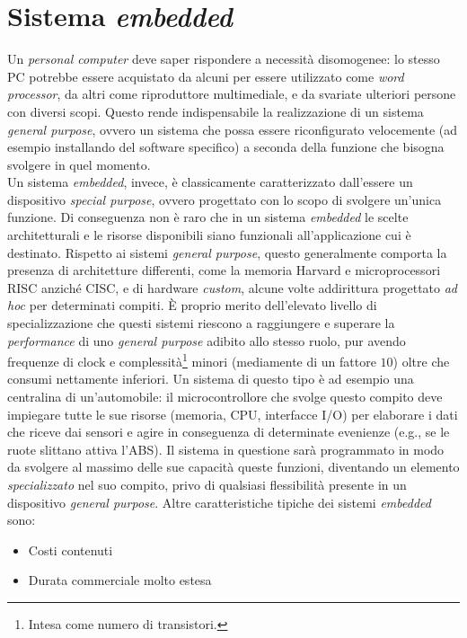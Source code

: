 \section{Sistema \emph{embedded}}
Un \emph{personal computer} deve saper rispondere a necessità disomogenee:
lo stesso PC potrebbe essere acquistato da alcuni per essere utilizzato come 
\emph{word processor}, da altri come riproduttore multimediale, e da svariate 
ulteriori persone con diversi scopi. Questo rende indispensabile la 
realizzazione di un sistema \emph{general purpose}, ovvero un sistema che possa 
essere riconfigurato velocemente (ad esempio installando del software 
specifico) a seconda della funzione che bisogna svolgere in quel momento.\\
Un sistema \emph{embedded}, invece, è classicamente caratterizzato dall'essere 
un dispositivo 
\emph{special purpose}, ovvero progettato con lo scopo di svolgere un'unica 
funzione. Di conseguenza non è raro che in un sistema \emph{embedded} 
le scelte architetturali e le risorse disponibili siano funzionali
all'applicazione cui è destinato. Rispetto ai sistemi \emph{general purpose}, 
questo generalmente comporta la presenza di architetture differenti, come la 
memoria Harvard e microprocessori RISC anziché CISC, e di hardware 
\emph{custom}, 
alcune volte addirittura progettato \emph{ad hoc} per determinati compiti.
\`E proprio 
merito dell'elevato livello di 
specializzazione che questi sistemi riescono a raggiungere e superare la 
\emph{performance} di uno \emph{general purpose} adibito allo stesso ruolo, pur 
avendo frequenze di clock e complessità\footnote{Intesa come numero di 
transistori.} minori (mediamente di un fattore $10$) oltre che consumi 
nettamente 
inferiori.
Un sistema di questo tipo è ad esempio una centralina di un'automobile: il 
microcontrollore che svolge questo compito deve impiegare tutte le sue risorse 
(memoria, CPU, interfacce I/O) per elaborare i dati che riceve dai sensori e 
agire in conseguenza di determinate evenienze (e.g., se le ruote slittano 
attiva l'ABS). Il sistema in questione sarà programmato in modo da 
svolgere al massimo delle sue capacità queste funzioni, diventando un elemento 
\emph{specializzato} nel suo compito, privo di qualsiasi flessibilità presente 
in un dispositivo \emph{general purpose}.
Altre caratteristiche tipiche dei sistemi \emph{embedded} sono:
\begin{itemize}
\item Costi contenuti
\item Durata commerciale molto estesa
\end{itemize}

